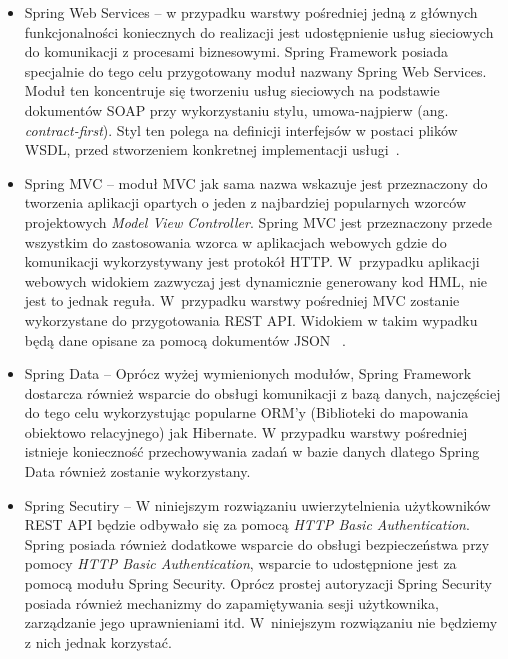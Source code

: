\begin{itemize}

\item Spring Web Services  -- w przypadku warstwy pośredniej jedną z głównych funkcjonalności koniecznych do realizacji jest udostępnienie usług sieciowych do komunikacji z procesami biznesowymi. Spring Framework posiada specjalnie do tego celu przygotowany moduł nazwany Spring Web Services. Moduł ten koncentruje się tworzeniu usług sieciowych na podstawie dokumentów SOAP przy wykorzystaniu stylu, umowa-najpierw (ang. \textit{contract-first}). Styl ten polega na definicji interfejsów w postaci plików WSDL, przed stworzeniem konkretnej implementacji usługi~\cite{springWS}.

\item Spring MVC -- moduł MVC jak sama nazwa wskazuje jest przeznaczony do tworzenia aplikacji opartych o jeden z najbardziej popularnych wzorców projektowych \textit{Model View Controller}. Spring MVC jest przeznaczony przede wszystkim do zastosowania wzorca w aplikacjach webowych gdzie do komunikacji wykorzystywany jest protokół HTTP. W~przypadku aplikacji webowych widokiem zazwyczaj jest dynamicznie generowany kod HML, nie jest to jednak reguła. W~przypadku warstwy pośredniej MVC zostanie wykorzystane do przygotowania REST API. Widokiem w takim wypadku będą dane opisane za pomocą dokumentów JSON ~\cite{springMVC}. 

\item Spring Data -- Oprócz wyżej wymienionych modułów, Spring Framework dostarcza również wsparcie do obsługi komunikacji z bazą danych, najczęściej do tego celu wykorzystując popularne ORM'y (Biblioteki do mapowania obiektowo relacyjnego) jak Hibernate. W przypadku warstwy pośredniej istnieje konieczność przechowywania zadań w bazie danych dlatego Spring Data również zostanie wykorzystany.

\item Spring Secutiry -- W niniejszym rozwiązaniu uwierzytelnienia użytkowników REST API będzie odbywało się za pomocą \textit{HTTP Basic Authentication}. Spring posiada również dodatkowe wsparcie do obsługi bezpieczeństwa przy pomocy \textit{HTTP Basic Authentication}, wsparcie to udostępnione jest za pomocą modułu Spring Security. Oprócz prostej autoryzacji Spring Security posiada również mechanizmy do zapamiętywania sesji użytkownika, zarządzanie jego uprawnieniami itd. W~niniejszym rozwiązaniu nie będziemy z nich jednak korzystać.   

\end{itemize}


